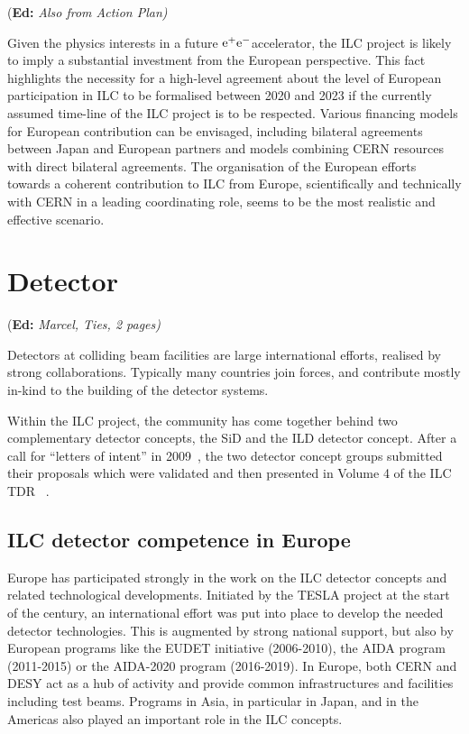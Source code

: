 \documentclass[%
 reprint,
 floatfix,
 amsmath,amssymb,
 aps,
]{revtex4-1}
\newif\ifEdNotes \EdNotestrue
\newcommand{\doednote}[1]{{\color{red}(\textbf{Ed:} \textit{#1)}}}
\newcommand{\ednote}[1]{\ifEdNotes 
  \doednote{#1} 
\fi}
\newcommand{\epem}{\mbox{${\rm e}^+{\rm e}^-$}}
\begin{document}
\ednote{Also from Action Plan}
Given the physics interests in a future \epem accelerator, the ILC project is likely to imply a substantial investment from
the European perspective. This fact highlights the necessity for a high-level
agreement about the level of European participation in ILC to be formalised between 2020
and 2023 if the currently assumed time-line of the ILC project is to be respected. Various
financing models for European contribution can be envisaged, including bilateral agreements
between Japan and European partners and models combining CERN resources with direct bilateral
agreements. The organisation of the European efforts towards a coherent contribution to ILC
from Europe, scientifically and technically with CERN in a leading coordinating role, seems to be
the most realistic and effective scenario.


\section{\label{sec:det}Detector}
\ednote{Marcel, Ties, 2 pages}

Detectors at colliding beam facilities are large international efforts, realised by strong collaborations. 
Typically many countries join forces, and contribute mostly in-kind to the building of the detector systems. 

Within the ILC project, the community has come together behind two complementary detector concepts, the SiD and the ILD detector concept. 
After a call for ``letters of intent'' in 2009~\cite{Aihara:2009ad,Abe:2010aa}, the two detector concept groups submitted their proposals 
which were validated and then presented in Volume 4 of the ILC TDR ~\cite{Behnke:2013lya}.

\subsection{ILC detector competence in Europe~\label{sec:det:competence}}
Europe has participated strongly in the work on the ILC detector concepts and 
related technological developments. Initiated by the TESLA project at the start 
of the century, an international effort was put into place to develop the needed 
detector technologies. This is augmented by strong national support, but also by 
European programs like the EUDET initiative (2006-2010), the AIDA program 
(2011-2015) or the AIDA-2020 program (2016-2019). In Europe, both CERN and DESY 
act as a hub of activity and provide common infrastructures and facilities 
including test beams. Programs in Asia, in particular in Japan, and in the 
Americas also played an important role in the ILC concepts. 
\end{document}

